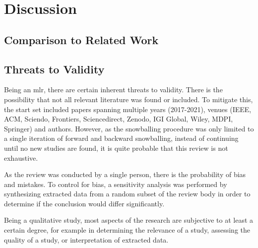 \chapter{Discussion}
\section{Comparison to Related Work}
\section{Threats to Validity}
Being an \acrshort{mlr}, there are certain inherent threats to validity.
There is the possibility that not all relevant literature was found or included.
To mitigate this, the start set included papers spanning multiple years (2017-2021), venues (IEEE, ACM, Sciendo, Frontiers, Sciencedirect, Zenodo, IGI Global, Wiley, MDPI, Springer) and authors.
However, as the snowballing procedure was only limited to a single iteration of forward and backward snowballing, instead of continuing until no new studies are found, it is quite probable that this review is not exhaustive.

As the review was conducted by a single person, there is the probability of bias and mistakes.
To control for bias, a sensitivity analysis was performed by synthesizing extracted data from a random subset of the review body in order to determine if the conclusion would differ significantly.

Being a qualitative study, most aspects of the research are subjective to at least a certain degree, for example in determining the relevance of a study, assessing the quality of a study, or interpretation of extracted data.
